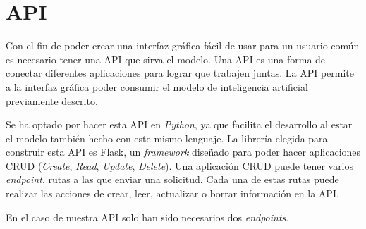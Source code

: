 \documentclass[12pt]{report} %
\begin{document}
	\section{API}
	Con el fin de poder crear una interfaz gráfica fácil de usar para un usuario común es necesario tener una API que sirva el modelo.
	Una API es una forma de conectar diferentes aplicaciones para lograr que trabajen juntas. La API permite
	a la interfaz gráfica poder consumir el modelo de inteligencia artificial previamente descrito.

	Se ha optado por hacer esta API en \textit{Python}, ya que facilita el desarrollo al estar el modelo también hecho con
	este mismo lenguaje. La librería elegida para construir esta API es Flask, un \textit{framework} diseñado para poder hacer
	aplicaciones CRUD (\textit{Create}, \textit{Read}, \textit{Update}, \textit{Delete}). Una aplicación CRUD puede tener varios
	\textit{endpoint}, rutas a las que enviar una solicitud. Cada una de estas rutas puede realizar las acciones 
	de crear, leer, actualizar o borrar información en la API.
	
	En el caso de nuestra API solo han sido necesarios dos \textit{endpoints}.
\end{document}
